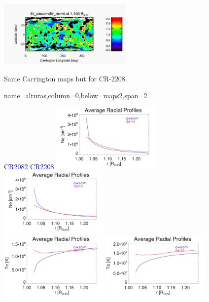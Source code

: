 \documentclass[paperwidth=100cm,paperheight=120cm]{baposter}
\def\azul#1{\textcolor{blue}{#1}}
\begin{document}
\begin{poster}
{{\begin{center}
{\includegraphics[width=0.49\textwidth]{map_ratio_qrad_awsom_2208_185-Er_CR2208_DEMT-EUVI_behind_H1-L502020_r3d_1105_Rsun.pdf}}\\
\end{center}
Same Carrington maps but for CR-2208.
}
}

{name=alturas,column=0,below=maps2,span=2}{
{\footnotesize\sf
\begin{center}
\azul{\hskip 3.5cm CR2082 \hfill CR2208 \hskip 3.5cm}
\vskip 0.01cm
{\includegraphics[width=0.4\textwidth]{Average_Radial_Profiles_Ne_awsom_vs_demt_H_cr2082_ratio_streamer.pdf}}
{\includegraphics[width=0.4\textwidth]{Average_Radial_Profiles_Ne_awsom_vs_demt_H_cr2208_ratio_streamer.pdf}}\\
{\includegraphics[width=0.4\textwidth]{Average_Radial_Profiles_Te_awsom_vs_demt_H_cr2082_ratio_streamer.pdf}}
{\includegraphics[width=0.4\textwidth]{Average_Radial_Profiles_Te_awsom_vs_demt_H_cr2208_ratio_streamer.pdf}}\\

\end{center}}}
\end{poster}
\end{document}
